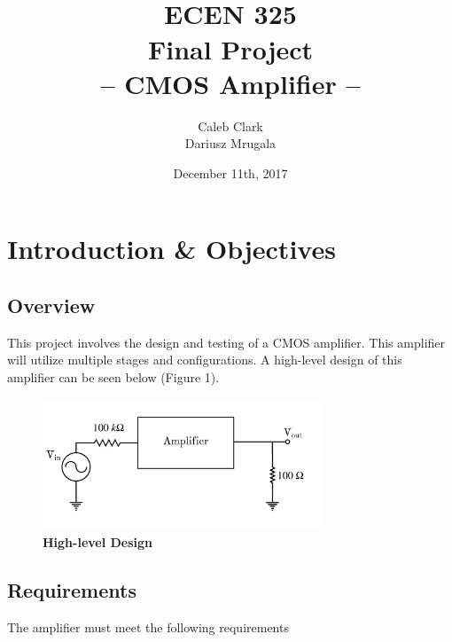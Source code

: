\documentclass{article}
\begin{document}
\pretitle{%
\begin{center}\LARGE
\rule{5in}{1pt}\par
}
\posttitle{\par\rule{5in}{0.5pt}\end{center}\vskip 0.5em}

 \title{\\\Huge \bfseries ECEN 325
\\ \LARGE Final Project
\\ \large -- CMOS Amplifier --\\}

\author{Caleb Clark\\Dariusz Mrugala}
\date{December 11th, 2017}
\maketitle
\thispagestyle{empty}
\clearpage
\thispagestyle{empty}
\tableofcontents
\setlength\parindent{0pt}
\pagebreak
\setcounter{page}{1}
\section{Introduction \& Objectives}
\subsection{Overview}
 \quad \quad This project involves the design and testing of a CMOS amplifier. This amplifier will utilize multiple stages and configurations. A high-level design of this amplifier can be seen below (Figure 1).   \\
	\begin{figure}[H]
    	\centerline{\includegraphics[width=0.75\textwidth]{high_level}}
    	\caption{\textbf{High-level Design}}
    \end{figure}
    
\subsection{Requirements}
\quad \quad The amplifier must meet the following requirements
\end{document}
